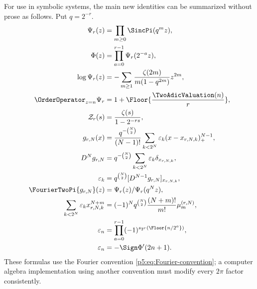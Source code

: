 \documentclass[11pt]{article}
\theoremstyle{definition}
\theoremstyle{remark}
\newcommand{\eps}{\varepsilon}
\begin{document}
For use in symbolic systems, the main new identities can be summarized without
prose as follows.  Put $q=2^{-r}$.
\begin{align}
 \Psi_r(z)&=\prod_{m\ge0}\SincPi(q^mz),                    \label{p5:eq:machine-1}\\
 \Phi(z)&=\prod_{a=0}^{r-1}\Psi_r(2^{-a}z),                \label{p5:eq:machine-2}\\
 \log\Psi_r(z)&=-\sum_{m\ge1}\frac{\zeta(2m)}{m(1-q^{2m})}z^{2m}, \label{p5:eq:machine-3}\\
 \OrderOperator_{z=n}\Psi_r&=1+\Floor{\frac{\TwoAdicValuation(n)}r}, \label{p5:eq:machine-4}\\
 \mathcal Z_r(s)&=\frac{\zeta(s)}{1-2^{-rs}},             \label{p5:eq:machine-5}\\
 g_{r,N}(x)&=\frac{q^{-\binom N2}}{(N-1)!}
 \sum_{k<2^N}\eps_k(x-x_{r,N,k})_+^{N-1},                \label{p5:eq:machine-6}\\
 D^Ng_{r,N}&=q^{-\binom N2}\sum_{k<2^N}\eps_k\delta_{x_{r,N,k}}, \label{p5:eq:machine-7}\\
 \eps_k&=q^{\binom N2}[D^{N-1}g_{r,N}]_{x_{r,N,k}},       \label{p5:eq:machine-8}\\
 \FourierTwoPi{g_{r,N}}(z)&=\Psi_r(z)/\Psi_r(q^Nz),            \label{p5:eq:machine-9}\\
 \sum_{k<2^N}\eps_kx_{r,N,k}^{N+m}
 &=(-1)^Nq^{\binom N2}\frac{(N+m)!}{m!}\mu_m^{(r,N)},    \label{p5:eq:machine-10}\\
 \eps_n&=\prod_{a=0}^{r-1}(-1)^{s_{2^r}(\Floor{n/2^a})}, \label{p5:eq:machine-11}\\
 \eps_n&=-\Sign\Phi'(2n+1).                               \label{p5:eq:machine-12}
\end{align}
These formulas use the Fourier convention \eqref{p5:eq:Fourier-convention}; a
computer algebra implementation using another convention must modify every
$2\pi$ factor consistently.
\end{document}
